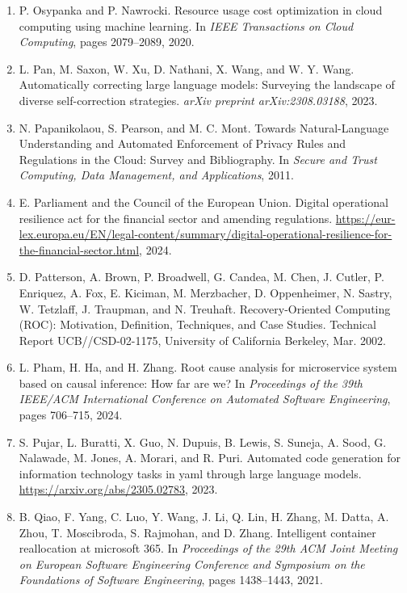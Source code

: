 \documentclass[10pt,UTF8,fontset=fandol]{ctexart}
\begin{document}
\begin{enumerate}[leftmargin=2em,itemsep=2pt]
\item P. Osypanka and P. Nawrocki. Resource usage cost optimization in cloud computing using machine learning. In \textit{IEEE Transactions on Cloud Computing}, pages 2079--2089, 2020.

\item L. Pan, M. Saxon, W. Xu, D. Nathani, X. Wang, and W. Y. Wang. Automatically correcting large language models: Surveying the landscape of diverse self-correction strategies. \textit{arXiv preprint arXiv:2308.03188}, 2023.

\item N. Papanikolaou, S. Pearson, and M. C. Mont. Towards Natural-Language Understanding and Automated Enforcement of Privacy Rules and Regulations in the Cloud: Survey and Bibliography. In \textit{Secure and Trust Computing, Data Management, and Applications}, 2011.

\item E. Parliament and the Council of the European Union. Digital operational resilience act for the financial sector and amending regulations. \url{https://eur-lex.europa.eu/EN/legal-content/summary/digital-operational-resilience-for-the-financial-sector.html}, 2024.

\item D. Patterson, A. Brown, P. Broadwell, G. Candea, M. Chen, J. Cutler, P. Enriquez, A. Fox, E. Kiciman, M. Merzbacher, D. Oppenheimer, N. Sastry, W. Tetzlaff, J. Traupman, and N. Treuhaft. Recovery-Oriented Computing (ROC): Motivation, Definition, Techniques, and Case Studies. Technical Report UCB//CSD-02-1175, University of California Berkeley, Mar. 2002.

\item L. Pham, H. Ha, and H. Zhang. Root cause analysis for microservice system based on causal inference: How far are we? In \textit{Proceedings of the 39th IEEE/ACM International Conference on Automated Software Engineering}, pages 706--715, 2024.

\item S. Pujar, L. Buratti, X. Guo, N. Dupuis, B. Lewis, S. Suneja, A. Sood, G. Nalawade, M. Jones, A. Morari, and R. Puri. Automated code generation for information technology tasks in yaml through large language models. \url{https://arxiv.org/abs/2305.02783}, 2023.

\item B. Qiao, F. Yang, C. Luo, Y. Wang, J. Li, Q. Lin, H. Zhang, M. Datta, A. Zhou, T. Moscibroda, S. Rajmohan, and D. Zhang. Intelligent container reallocation at microsoft 365. In \textit{Proceedings of the 29th ACM Joint Meeting on European Software Engineering Conference and Symposium on the Foundations of Software Engineering}, pages 1438--1443, 2021.


\end{enumerate}
\end{document}
